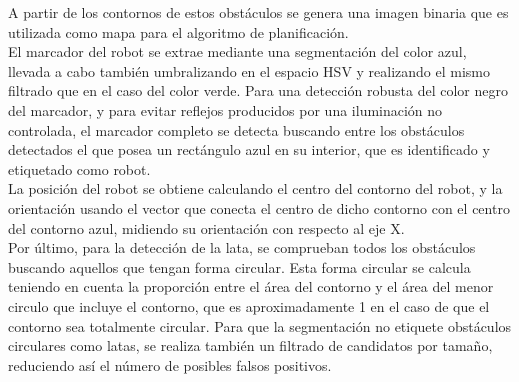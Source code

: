 A partir de los contornos de estos obstáculos se genera una imagen binaria que es utilizada como mapa para el algoritmo de planificación.\\

El marcador del robot se extrae mediante una segmentación del color azul, llevada a cabo también umbralizando en el espacio HSV y realizando el mismo filtrado que en el caso del color verde. Para una detección robusta del color negro del marcador, y para evitar reflejos producidos por una iluminación no controlada, el marcador completo se detecta buscando entre los obstáculos detectados el que posea un rectángulo azul en su interior, que es identificado y etiquetado como robot.\\ 

La posición del robot se obtiene calculando el centro del contorno del robot, y la orientación usando el vector que conecta el centro de dicho contorno con el centro del contorno azul, midiendo su orientación con respecto al eje X.\\

Por último, para la detección de la lata, se comprueban todos los obstáculos buscando aquellos que tengan forma circular. Esta forma circular se calcula teniendo en cuenta la proporción entre el área del contorno y el área del menor circulo que incluye el contorno, que es aproximadamente 1 en el caso de que el contorno sea totalmente circular. Para que la segmentación no etiquete obstáculos circulares como latas, se realiza también un filtrado de candidatos por tamaño, reduciendo así el número de posibles falsos positivos.\\